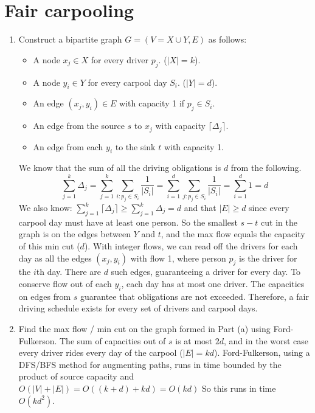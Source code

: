 \documentclass[12pt]{article}
\begin{document}
\section{Fair carpooling}

\begin{enumerate}
\item %
%
Construct a bipartite graph $G = (V = X \cup Y, E)$ as follows:
\begin{itemize}
\item A node $x_j \in X$ for every driver $p_j$. ($|X|=k$).
\item A node $y_i \in Y$ for every carpool day $S_i$. ($|Y|=d$).
\item An edge $(x_j,y_i) \in E$ with capacity 1 if $p_j \in S_i$.
\item An edge from the source $s$ to $x_j$ with capacity $\lceil \Delta_j \rceil$.
\item An edge from each $y_i$ to the sink $t$ with capacity 1.
\end{itemize}
%
We know that the sum of all the driving obligations is $d$ from the following.
%
\begin{displaymath}
\sum_{j=1}^{k} \Delta_j = \sum_{j=1}^{k} \sum_{i:p_j \in S_i}
\frac{1}{|S_i|} = \sum_{i=1}^{d} \sum_{j:p_j \in S_i} \frac{1}{|S_i|}
= \sum_{i=1}^{d} 1 = d
\end{displaymath}
%
We also know:
$\sum_{j=1}^{k} \lceil \Delta_j \rceil \ge \sum_{j=1}^{k} \Delta_j = d$
and that $|E| \ge d$ since every carpool day must have at least one
person. So the smallest $s-t$ cut in the graph is on the edges between $Y$
and $t$, and the max flow equals the capacity of this min cut ($d$).
With integer flows, we can read off the drivers for each
day as all the edges $(x_j,y_i)$ with flow 1, where person $p_j$ is the
driver for the $i$th day. There are $d$ such edges, guaranteeing a driver
for every day. To conserve flow out of each $y_i$, each day has at most
one driver.
The capacities on edges from $s$ guarantee that obligations
are not exceeded. Therefore, a fair driving schedule exists for every
set of drivers and carpool days.

\item %
Find the max flow / min cut on the graph formed in Part (a) using
Ford-Fulkerson. The sum of capacities out of $s$ is at most $2d$, and in
the worst case every driver rides every day of the carpool ($|E|=kd$).
Ford-Fulkerson, using a DFS/BFS method for augmenting paths, runs in
time bounded by the product of source capacity and
$O(|V|+|E|) = O((k+d)+kd) = O(kd)$
So this runs in time $O(kd^2)$.


\end{enumerate}
\end{document}
